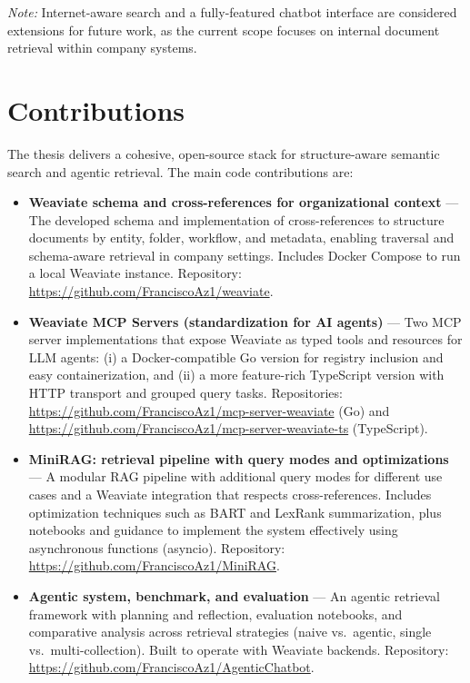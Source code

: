 \textit{Note:} Internet-aware search and a fully-featured chatbot interface are considered extensions for future work, as the current scope focuses on internal document retrieval within company systems.

\section{Contributions}
The thesis delivers a cohesive, open-source stack for structure-aware semantic search and agentic retrieval. The main code contributions are:

\begin{itemize}
	\item \textbf{Weaviate schema and cross-references for organizational context} — The developed schema and implementation of cross-references to structure documents by entity, folder, workflow, and metadata, enabling traversal and schema-aware retrieval in company settings. Includes Docker Compose to run a local Weaviate instance. Repository: \url{https://github.com/FranciscoAz1/weaviate}.

	\item \textbf{Weaviate MCP Servers (standardization for AI agents)} — Two \gls{MCP} server implementations that expose Weaviate as typed tools and resources for LLM agents: (i) a Docker-compatible Go version for registry inclusion and easy containerization, and (ii) a more feature-rich TypeScript version with HTTP transport and grouped query tasks. Repositories: \url{https://github.com/FranciscoAz1/mcp-server-weaviate} (Go) and \url{https://github.com/FranciscoAz1/mcp-server-weaviate-ts} (TypeScript).

	\item \textbf{MiniRAG: retrieval pipeline with query modes and optimizations} — A modular RAG pipeline with additional query modes for different use cases and a Weaviate integration that respects cross-references. Includes optimization techniques such as BART and LexRank summarization, plus notebooks and guidance to implement the system effectively using asynchronous functions (asyncio). Repository: \url{https://github.com/FranciscoAz1/MiniRAG}.

	\item \textbf{Agentic system, benchmark, and evaluation} — An agentic retrieval framework with planning and reflection, evaluation notebooks, and comparative analysis across retrieval strategies (naive vs.\ agentic, single vs.\ multi-collection). Built to operate with Weaviate backends. Repository: \url{https://github.com/FranciscoAz1/AgenticChatbot}.
\end{itemize}


